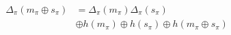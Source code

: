 \documentclass[twocolumn, aps, amsmath, amssymb, nofootinbib, superscriptaddress, longbibliography, doublefloatfix, table-of-contents, eqsecnum, rmp]{revtex4-2}
\begin{document}
\begin{align}
	\Delta_\pi(m_\pi\oplus s_\pi) &= \Delta_\pi(m_\pi) \Delta_\pi(s_\pi) \nonumber\\
	&\oplus h(m_\pi) \oplus h(s_\pi) \oplus h(m_\pi \oplus s_\pi)
\end{align}



%
%
%
%
%
%
\end{document}
